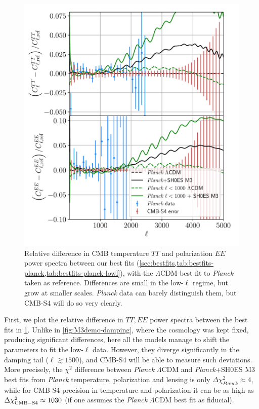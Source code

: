 \begin{figure}[ht!]
\includegraphics[width=\columnwidth]{img/bestfits-damping.pdf}
\caption[Relative difference in CMB temperature and polarization power spectra between our best fits and the $\Lambda$CDM best fit to {\it Planck}]{Relative difference in CMB temperature $TT$ and polarization $EE$ power spectra between our best fits (\cref{sec:bestfits,tab:bestfits-planck,tab:bestfits-planck-lowl}), with the $\Lambda$CDM best fit to {\it Planck} taken as reference.
Differences are small in the low-$\ell$ regime, but grow at smaller scales.
{\it Planck} data can barely distinguish them, but CMB-S4 will do so very clearly.}
\label{fig:bestfits-damping}
\end{figure}

First, we plot the relative difference in $TT,EE$ power spectra between the best fits in \cref{fig:bestfits-damping}.
Unlike in \cref{fig:M3demo-damping}, where the cosmology was kept fixed, producing significant differences, here all the models manage to shift the parameters to fit the low-$\ell$ data.
However, they diverge significantly in the damping tail ($\ell\gtrsim 1500$), and CMB-S4 will be able to measure such deviations.
More precisely, the $\chi^2$ difference between {\it Planck} $\Lambda$CDM and {\it Planck}+SH0ES M3 best fits from {\it Planck} temperature, polarization and lensing is only $\Delta\chi^2_{Planck}\approx 4$, while for CMB-S4 precision in temperature and polarization it can be as high as $\Delta\chi^2_{\rm CMB-S4}\approx 1030$ (if one assumes the {\it Planck} $\Lambda$CDM best fit as fiducial).

